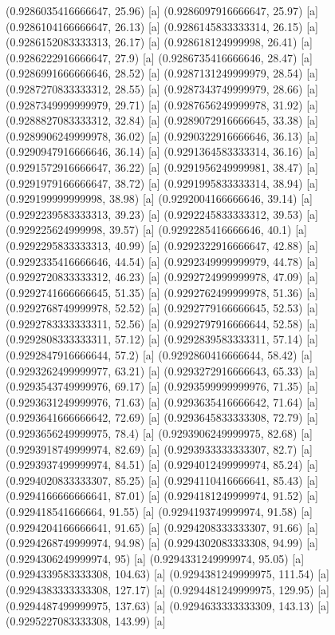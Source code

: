 {{{(0.9286035416666647, 25.96) [a] 
(0.9286097916666647, 25.97) [a] 
(0.9286104166666647, 26.13) [a] 
(0.9286145833333314, 26.15) [a] 
(0.9286152083333313, 26.17) [a] 
(0.928618124999998, 26.41) [a] 
(0.9286222916666647, 27.9) [a] 
(0.9286735416666646, 28.47) [a] 
(0.9286991666666646, 28.52) [a] 
(0.9287131249999979, 28.54) [a] 
(0.9287270833333312, 28.55) [a] 
(0.9287343749999979, 28.66) [a] 
(0.9287349999999979, 29.71) [a] 
(0.9287656249999978, 31.92) [a] 
(0.9288827083333312, 32.84) [a] 
(0.9289072916666645, 33.38) [a] 
(0.9289906249999978, 36.02) [a] 
(0.9290322916666646, 36.13) [a] 
(0.9290947916666646, 36.14) [a] 
(0.9291364583333314, 36.16) [a] 
(0.9291572916666647, 36.22) [a] 
(0.9291956249999981, 38.47) [a] 
(0.9291979166666647, 38.72) [a] 
(0.9291995833333314, 38.94) [a] 
(0.929199999999998, 38.98) [a] 
(0.9292004166666646, 39.14) [a] 
(0.9292239583333313, 39.23) [a] 
(0.9292245833333312, 39.53) [a] 
(0.929225624999998, 39.57) [a] 
(0.9292285416666646, 40.1) [a] 
(0.9292295833333313, 40.99) [a] 
(0.9292322916666647, 42.88) [a] 
(0.9292335416666646, 44.54) [a] 
(0.9292349999999979, 44.78) [a] 
(0.9292720833333312, 46.23) [a] 
(0.9292724999999978, 47.09) [a] 
(0.9292741666666645, 51.35) [a] 
(0.9292762499999978, 51.36) [a] 
(0.9292768749999978, 52.52) [a] 
(0.9292779166666645, 52.53) [a] 
(0.9292783333333311, 52.56) [a] 
(0.9292797916666644, 52.58) [a] 
(0.9292808333333311, 57.12) [a] 
(0.9292839583333311, 57.14) [a] 
(0.9292847916666644, 57.2) [a] 
(0.9292860416666644, 58.42) [a] 
(0.9293262499999977, 63.21) [a] 
(0.9293272916666643, 65.33) [a] 
(0.9293543749999976, 69.17) [a] 
(0.9293599999999976, 71.35) [a] 
(0.9293631249999976, 71.63) [a] 
(0.9293635416666642, 71.64) [a] 
(0.9293641666666642, 72.69) [a] 
(0.9293645833333308, 72.79) [a] 
(0.9293656249999975, 78.4) [a] 
(0.9293906249999975, 82.68) [a] 
(0.9293918749999974, 82.69) [a] 
(0.9293933333333307, 82.7) [a] 
(0.9293937499999974, 84.51) [a] 
(0.9294012499999974, 85.24) [a] 
(0.9294020833333307, 85.25) [a] 
(0.9294110416666641, 85.43) [a] 
(0.9294166666666641, 87.01) [a] 
(0.9294181249999974, 91.52) [a] 
(0.929418541666664, 91.55) [a] 
(0.9294193749999974, 91.58) [a] 
(0.9294204166666641, 91.65) [a] 
(0.9294208333333307, 91.66) [a] 
(0.9294268749999974, 94.98) [a] 
(0.9294302083333308, 94.99) [a] 
(0.9294306249999974, 95) [a] 
(0.9294331249999974, 95.05) [a] 
(0.9294339583333308, 104.63) [a] 
(0.9294381249999975, 111.54) [a] 
(0.9294383333333308, 127.17) [a] 
(0.9294481249999975, 129.95) [a] 
(0.9294487499999975, 137.63) [a] 
(0.9294633333333309, 143.13) [a] 
(0.9295227083333308, 143.99) [a] 
}}}
